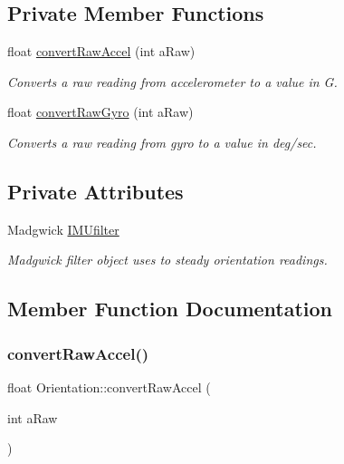 \subsection*{Private Member Functions}
\begin{DoxyCompactItemize}
\item 
float \hyperlink{class_orientation_ab8a6f65b7f2b43ec5dd09c47fe93fa0b}{convert\+Raw\+Accel} (int a\+Raw)
\begin{DoxyCompactList}\small\item\em Converts a raw reading from accelerometer to a value in G. \end{DoxyCompactList}\item 
float \hyperlink{class_orientation_a99bb5ed3c3226c5d636fa48f26f491dd}{convert\+Raw\+Gyro} (int a\+Raw)
\begin{DoxyCompactList}\small\item\em Converts a raw reading from gyro to a value in deg/sec. \end{DoxyCompactList}\end{DoxyCompactItemize}
\subsection*{Private Attributes}
\begin{DoxyCompactItemize}
\item 
\mbox{\label{class_orientation_a3b0d70328334e69797438ccc408806c1}} 
Madgwick \hyperlink{class_orientation_a3b0d70328334e69797438ccc408806c1}{I\+M\+Ufilter}
\begin{DoxyCompactList}\small\item\em Madgwick filter object uses to steady orientation readings. \end{DoxyCompactList}\end{DoxyCompactItemize}


\subsection{Member Function Documentation}
\mbox{\label{class_orientation_ab8a6f65b7f2b43ec5dd09c47fe93fa0b}} 
\subsubsection{\texorpdfstring{convert\+Raw\+Accel()}{convertRawAccel()}}
{\footnotesize\ttfamily float Orientation\+::convert\+Raw\+Accel (\begin{DoxyParamCaption}\item[{int}]{a\+Raw }\end{DoxyParamCaption})\hspace{0.3cm}{\ttfamily [private]}}



